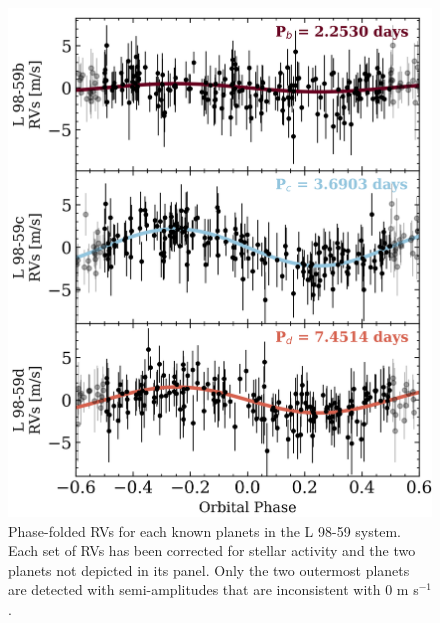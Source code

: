 \documentclass[longauth]{aa}
\newcommand{\mps}{m s$^{-1}$}
\begin{document}
\begin{figure}
    \centering
    \includegraphics[width=.96\hsize]{RVphased.png}
    \caption{Phase-folded RVs for each known planets in the L 98-59 system. Each set of RVs has been corrected for stellar activity and the two planets not depicted in its panel. Only the two outermost planets are detected with semi-amplitudes that are inconsistent with 0 \mps{.}}
    \label{fig:rvphased}
\end{figure}
\end{document}
